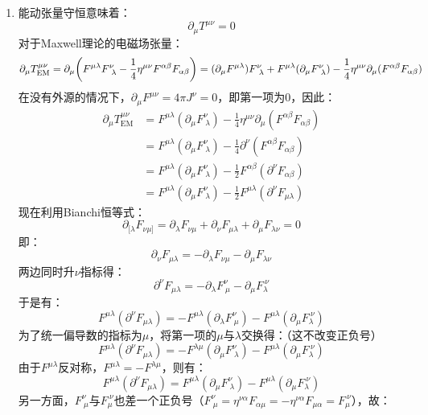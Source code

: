 \documentclass[a4paper]{article}
\begin{document}
\begin{enumerate}
    \bigskip
    \item[11.(b)]
    能动张量守恒意味着：
    \[
        \partial_\mu T^{\mu\nu} = 0
    \]
    对于Maxwell理论的电磁场张量：
    \[
        \partial_\mu T_{\mathrm{EM}}^{\mu\nu} = \partial_\mu \qty(F^{\mu\lambda} F^\nu_{\ \lambda} - \frac{1}{4} \eta^{\mu\nu} F^{\alpha\beta} F_{\alpha\beta}) = (\partial_\mu F^{\mu\lambda}) F^\nu_{\ \lambda} + F^{\mu\lambda} (\partial_\mu F^\nu_{\ \lambda}) - \frac{1}{4} \eta^{\mu\nu} \partial_\mu (F^{\alpha\beta} F_{\alpha\beta})
    \]
    在没有外源的情况下，$\partial_\mu F^{\mu\nu} = 4\pi J^\nu = 0$，即第一项为0，因此：
    \begin{align*}
        \partial_\mu T_{\mathrm{EM}}^{\mu\nu}
        &= F^{\mu\lambda} (\partial_\mu F^\nu_{\ \lambda}) - \frac{1}{4} \eta^{\mu\nu} \partial_\mu (F^{\alpha\beta} F_{\alpha\beta}) \\
        &= F^{\mu\lambda} (\partial_\mu F^\nu_{\ \lambda}) - \frac{1}{4} \partial^\nu (F^{\alpha\beta} F_{\alpha\beta}) \\
        &= F^{\mu\lambda} (\partial_\mu F^\nu_{\ \lambda}) - \frac{1}{2} F^{\alpha\beta} (\partial^\nu F_{\alpha\beta}) \\
        &= F^{\mu\lambda} (\partial_\mu F^\nu_{\ \lambda}) - \frac{1}{2} F^{\mu\lambda} (\partial^\nu F_{\mu\lambda})
    \end{align*}
    现在利用Bianchi恒等式：
    \[
        \partial_{[\lambda}F_{\nu\mu]} = \partial_\lambda F_{\nu\mu} + \partial_\nu F_{\mu\lambda} + \partial_\mu F_{\lambda\nu} = 0
    \]
    即：
    \[
        \partial_\nu F_{\mu\lambda} = -\partial_\lambda F_{\nu\mu} - \partial_\mu F_{\lambda\nu}
    \]
    两边同时升$\nu$指标得：
    \[
        \partial^\nu F_{\mu\lambda} = -\partial_\lambda F^\nu_{\ \mu} - \partial_\mu F_\lambda^{\ \nu}
    \]
    于是有：
    \[
        F^{\mu\lambda} (\partial^\nu F_{\mu\lambda}) = -F^{\mu\lambda} (\partial_\lambda F^\nu_{\ \mu}) - F^{\mu\lambda} (\partial_\mu F_\lambda^{\ \nu})
    \]
    为了统一偏导数的指标为$\mu$，将第一项的$\mu$与$\lambda$交换得：（这不改变正负号）
    \[
        F^{\mu\lambda} (\partial^\nu F_{\mu\lambda}) = -F^{\lambda\mu} (\partial_\mu F^\nu_{\ \lambda}) - F^{\mu\lambda} (\partial_\mu F_\lambda^{\ \nu})
    \]
    由于$F^{\mu\lambda}$反对称，$F^{\mu\lambda} = -F^{\lambda\mu}$，则有：
    \[
        F^{\mu\lambda} (\partial^\nu F_{\mu\lambda}) = F^{\mu\lambda} (\partial_\mu F^\nu_{\ \lambda}) - F^{\mu\lambda} (\partial_\mu F_\lambda^{\ \nu})
    \]
    另一方面，$F^\nu_{\ \mu}$与$F_\mu^{\ \nu}$也差一个正负号（$F^\nu_{\ \mu} = \eta^{\nu\alpha} F_{\alpha\mu} = -\eta^{\nu\alpha} F_{\mu\alpha} = F_\mu^{\ \nu}$），故：

\end{enumerate}
\end{document}
